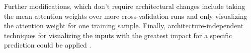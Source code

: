 Further modifications, which don't require architectural changes include taking the mean attention weights over more cross-validation runs and only visualizing the attention weight for one training sample. Finally, architecture-independent techniques for visualizing the inputs with the greatest impact for a specific prediction could be applied \cite{deeplift}.

%
























